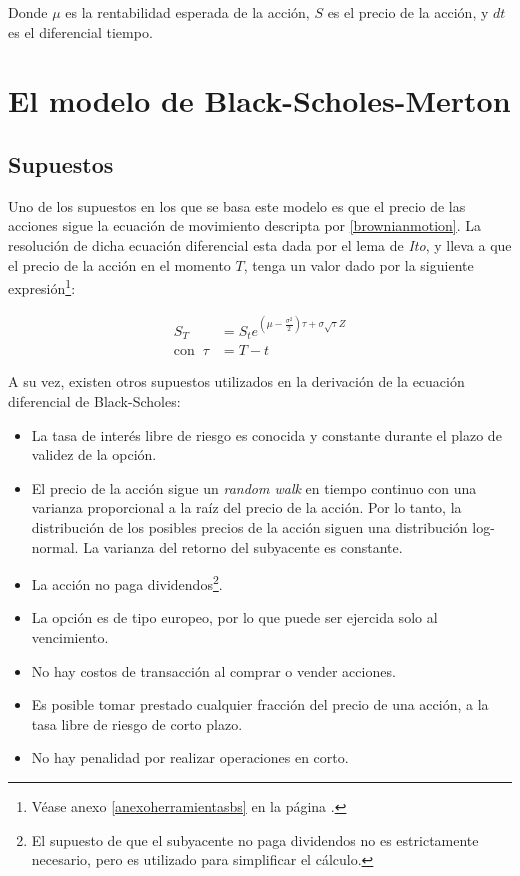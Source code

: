 Donde $ \mu $ es la rentabilidad esperada de la acción, $ S $ es el precio de la acción, y $ dt$ es el diferencial tiempo.



\section{El modelo de Black-Scholes-Merton}

\subsection{Supuestos}

Uno de los supuestos en los que se basa este modelo es que el precio de las acciones sigue la ecuación de movimiento descripta por \eqref{brownianmotion}. La resolución de dicha ecuación diferencial esta dada por el lema de \textit{Ito}, y lleva a que el precio de la acción en el momento $T$, tenga un valor dado por la siguiente expresión\footnote{Véase anexo \ref{anexoherramientasbs} en la página \pageref{anexoherramientasbs}.}:

\begin{align}
	S_T &= S_t e^{\left(\mu-\frac{\sigma^2}{2}\right)\tau+\sigma \sqrt{\tau} Z} \label{formulaST}\\
	\mathrm{con}\;\; \tau &= T-t \nonumber
\end{align}

A su vez, existen otros supuestos utilizados en la derivación de la ecuación diferencial de Black-Scholes\cite{black1973}:

\begin{itemize}
\item La tasa de interés libre de riesgo es conocida y constante durante el plazo de validez de la opción.
\item El precio de la acción sigue un \textit{random walk} en tiempo continuo con una varianza proporcional a la raíz del precio de la acción. Por lo tanto, la distribución de los posibles precios de la acción siguen una distribución log-normal. La varianza del retorno del subyacente es constante.
\item La acción no paga dividendos\footnote{El supuesto de que el subyacente no paga dividendos no es estrictamente necesario, pero es utilizado para simplificar el cálculo.}.
\item La opción es de tipo europeo, por lo que puede ser ejercida solo al vencimiento.
\item No hay costos de transacción al comprar o vender acciones.
\item Es posible tomar prestado cualquier fracción del precio de una acción, a la tasa libre de riesgo de corto plazo.
\item No hay penalidad por realizar operaciones en corto.
\end{itemize}


